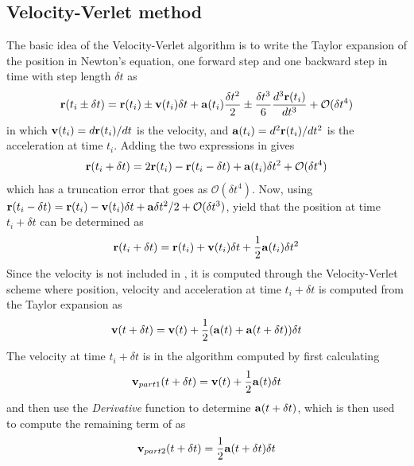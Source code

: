 \subsection{Velocity-Verlet method}
\label{sec:methodVV}
The basic idea of the Velocity-Verlet algorithm is to write the Taylor expansion of the position in Newton’s equation, one forward step and one backward step in time with step length $\delta t$ as
\begin{align}
	\mbox{\textbf{r}}(t_i \pm \delta t) = \mbox{\textbf{r}}(t_i) \pm \mbox{\textbf{v}} (t_i) \delta t
	+ \mbox{\textbf{a}} (t_i) \frac{\delta t ^2}{2}  \pm \frac{\delta t ^3}{6} \frac{d^3 \mbox{\textbf{r}}(t_i)}{dt^3} + \mathcal{O}(\delta t ^4 )
	\label{eq:TaylorExpVVmethod}
\end{align}
in which $\mbox{\textbf{v}}(t_i) = d\mbox{\textbf{r}}(t_i)/dt$ is the velocity, and $\mbox{\textbf{a}}(t_i) = d^2 \mbox{\textbf{r}}(t_i)/dt^2$ is the acceleration at time $t_i$.
\cite[p. 248]{CompLectureNotes}
Adding the two expressions in  gives
\begin{align}
	\mbox{\textbf{r}} (t_i +\delta t) = 2\mbox{\textbf{r}} (t_i) - \mbox{\textbf{r}} (t_i -\delta t)  + \mbox{\textbf{a}} (t_i ) \delta t^2 + \mathcal{O} (\delta t ^4 )
	\label{eq:TaylorExpVVmethod2}
\end{align}
which has a truncation error that goes as $\mathcal{O} (\delta t ^4 )$.
Now, using $\mbox{\textbf{r}}(t_i-\delta t) = \mbox{\textbf{r}}(t_i) - \mbox{\textbf{v}}(t_i) \delta t + \mbox{\textbf{a}} \delta t^2 /2 + \mathcal{O} (\delta t^3)$, yield that the position at time $t_i+\delta t$ can be determined as 
\begin{align}
	\mbox{\textbf{r}}(t_i+\delta t) = \mbox{\textbf{r}}(t_i) + \mbox{\textbf{v}} (t_i) \delta t + \frac{1}{2} \mbox{\textbf{a}} (t_i) \delta t^2 
	\label{eq:VVmethodNextPosition}
\end{align}
Since the velocity is not included in , it is computed through the Velocity-Verlet scheme where position, velocity and acceleration at time $t_i+\delta t$ is computed from the Taylor expansion as
\begin{align}
	\mbox{\textbf{v}} (t + \delta t) = \mbox{\textbf{v}} (t) + \frac{1}{2} ( \mbox{\textbf{a}} (t) + \mbox{\textbf{a}} (t + \delta t) ) \delta t
	\label{eq:VVmethodNextVelocity}
\end{align}
The velocity at time $t_i+\delta t$ is in the algorithm computed by first calculating 
\begin{align}
	\mbox{\textbf{v}}_{part1} (t + \delta t) = \mbox{\textbf{v}} (t) + \frac{1}{2}  \mbox{\textbf{a}} (t)  \delta t
	\label{eq:VVmethodNextVelocityPart1}
\end{align}
and then use the \textit{Derivative} function to determine $\mbox{\textbf{a}} (t + \delta t)$, which is then used to compute the remaining term of  as 
\begin{align}
	\mbox{\textbf{v}}_{part2} (t + \delta t) = \frac{1}{2} \mbox{\textbf{a}} (t + \delta t) \delta t
	\label{eq:VVmethodNextVelocityPart2}
\end{align}

